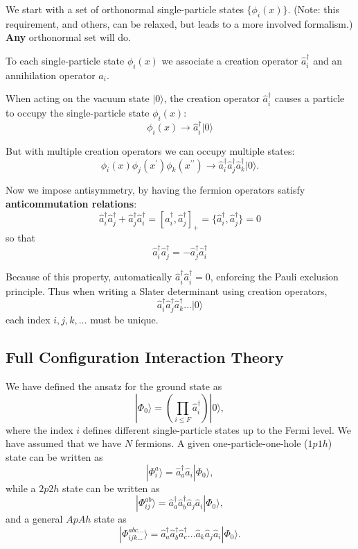 \documentclass[%
twoside,                 %
final,                   %
10pt]{article}
\begin{document}
We start with a set of orthonormal single-particle states $\{ \phi_i(x) \}$. 
(Note: this requirement, and others, can be relaxed, but leads to a 
more involved formalism.) \textbf{Any} orthonormal set will do. 

To each single-particle state $\phi_i(x)$ we associate a creation operator 
$\hat{a}^\dagger_i$ and an annihilation operator $\hat{a}_i$. 

When acting on the vacuum state $| 0 \rangle$, the creation operator $\hat{a}^\dagger_i$ causes 
a particle to occupy the single-particle state $\phi_i(x)$:
\[
\phi_i(x) \rightarrow \hat{a}^\dagger_i |0 \rangle
\]



But with multiple creation operators we can occupy multiple states:
\[
\phi_i(x) \phi_j(x^\prime) \phi_k(x^{\prime \prime}) 
\rightarrow \hat{a}^\dagger_i \hat{a}^\dagger_j \hat{a}^\dagger_k |0 \rangle.
\]

Now we impose antisymmetry, by having the fermion operators satisfy  \textbf{anticommutation relations}:
\[
\hat{a}^\dagger_i \hat{a}^\dagger_j + \hat{a}^\dagger_j \hat{a}^\dagger_i
= [ \hat{a}^\dagger_i ,\hat{a}^\dagger_j ]_+ 
= \{ \hat{a}^\dagger_i ,\hat{a}^\dagger_j \} = 0
\]
so that 
\[
\hat{a}^\dagger_i \hat{a}^\dagger_j = - \hat{a}^\dagger_j \hat{a}^\dagger_i
\]




Because of this property, automatically $\hat{a}^\dagger_i \hat{a}^\dagger_i = 0$, 
enforcing the Pauli exclusion principle.  Thus when writing a Slater determinant 
using creation operators, 
\[
\hat{a}^\dagger_i \hat{a}^\dagger_j \hat{a}^\dagger_k \ldots |0 \rangle
\]
each index $i,j,k, \ldots$ must be unique.




\subsection*{Full Configuration Interaction Theory}

We have defined the ansatz for the ground state as 
\[
|\Phi_0\rangle = \left(\prod_{i\le F}\hat{a}_{i}^{\dagger}\right)|0\rangle,
\]
where the index $i$ defines different single-particle states up to the Fermi level. We have assumed that we have $N$ fermions. 
A given one-particle-one-hole ($1p1h$) state can be written as
\[
|\Phi_i^a\rangle = \hat{a}_{a}^{\dagger}\hat{a}_i|\Phi_0\rangle,
\]
while a $2p2h$ state can be written as
\[
|\Phi_{ij}^{ab}\rangle = \hat{a}_{a}^{\dagger}\hat{a}_{b}^{\dagger}\hat{a}_j\hat{a}_i|\Phi_0\rangle,
\]
and a general $ApAh$ state as 
\[
|\Phi_{ijk\dots}^{abc\dots}\rangle = \hat{a}_{a}^{\dagger}\hat{a}_{b}^{\dagger}\hat{a}_{c}^{\dagger}\dots\hat{a}_k\hat{a}_j\hat{a}_i|\Phi_0\rangle.
\]
\end{document}
